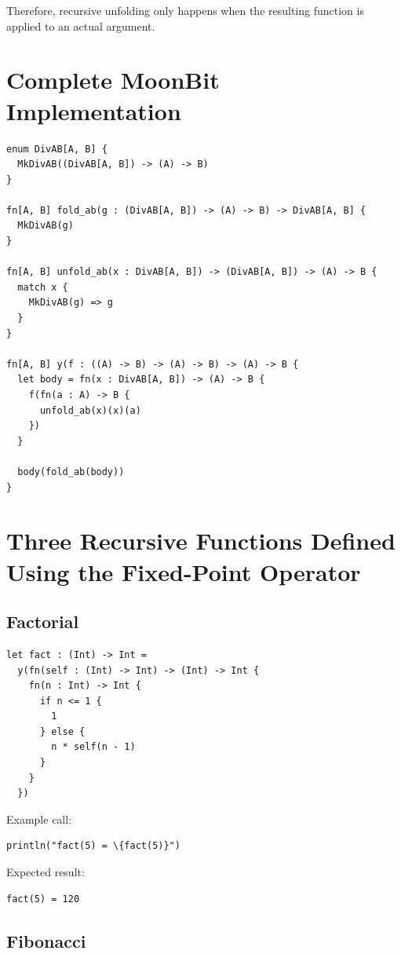 \documentclass[manuscript]{acmart}
\begin{document}
Therefore, recursive unfolding only happens when the resulting function is applied to an actual argument.

\section{Complete MoonBit Implementation}

\begin{lstlisting}
enum DivAB[A, B] {
  MkDivAB((DivAB[A, B]) -> (A) -> B)
}

fn[A, B] fold_ab(g : (DivAB[A, B]) -> (A) -> B) -> DivAB[A, B] {
  MkDivAB(g)
}

fn[A, B] unfold_ab(x : DivAB[A, B]) -> (DivAB[A, B]) -> (A) -> B {
  match x {
    MkDivAB(g) => g
  }
}

fn[A, B] y(f : ((A) -> B) -> (A) -> B) -> (A) -> B {
  let body = fn(x : DivAB[A, B]) -> (A) -> B {
    f(fn(a : A) -> B {
      unfold_ab(x)(x)(a)
    })
  }

  body(fold_ab(body))
}
\end{lstlisting}

\section{Three Recursive Functions Defined Using the Fixed-Point Operator}

\subsection{Factorial}

\begin{lstlisting}
let fact : (Int) -> Int =
  y(fn(self : (Int) -> Int) -> (Int) -> Int {
    fn(n : Int) -> Int {
      if n <= 1 {
        1
      } else {
        n * self(n - 1)
      }
    }
  })
\end{lstlisting}

Example call:

\begin{lstlisting}
println("fact(5) = \{fact(5)}")
\end{lstlisting}

Expected result:

\begin{lstlisting}
fact(5) = 120
\end{lstlisting}

\subsection{Fibonacci}
\end{document}
